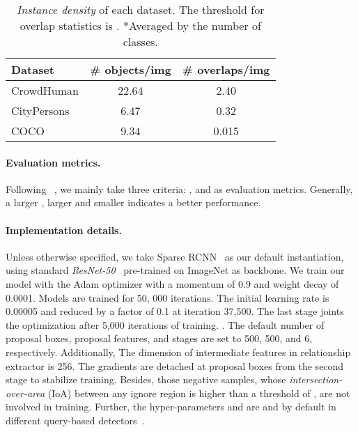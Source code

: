 \documentclass[final]{cvpr}
\begin{document}
\begin{table}[t]
  \centering
  \begin{tabular}{l|c|c}
      \toprule
      Dataset & \# objects/img & \# overlaps/img  \\
      \hline
      CrowdHuman \cite{shao2018crowdhuman} & 22.64  & 2.40 \\
      CityPersons \cite{zhang2017citypersons} & 6.47  & 0.32 \\
      COCO \cite{lin2014microsoft} & 9.34  & 0.015 \\
      \bottomrule
  \end{tabular}
  \vspace{-2pt}
  \caption{\emph{Instance density} of each dataset.  The threshold for overlap statistics is .  *Averaged by the number of classes.}
  \label{tbl:datasets}
\vspace{-1.pc}
\end{table} 

\vspace{-1pc} 
\paragraph{Evaluation metrics.}

Following ~\cite{chu2020detection}, we mainly take three criteria: ,  and  as evaluation metrics. Generally, a larger , larger  and smaller  indicates a better performance.

\vspace{-1pc} 
\paragraph{Implementation details.} 
Unless otherwise specified, we take Sparse RCNN~\cite{sun2020sparse} as our default instantiation, using standard \textit{ResNet-50}~\cite{he2016deep} pre-trained on ImageNet as backbone. We train our model with the Adam optimizer with a momentum of 0.9 and weight decay of 0.0001. Models are trained for 50, 000 iterations. The initial learning rate is 0.00005 and reduced by a factor of 0.1 at iteration 37,500. The last stage joints the optimization after 5,000 iterations of training. . The default number of proposal boxes, proposal features, and stages are set to 500, 500, and 6, respectively. Additionally, The dimension of intermediate features in relationship extractor  is 256. The gradients are detached at proposal boxes from the second stage to stabilize training. Besides, those negative samples, whose \textit{intersection-over-area} (IoA) between any ignore region is higher than a threshold of ,  are not involved in training. Further, the hyper-parameters  and  are  and  by default in different query-based detectors~\cite{sun2020sparse,zhu2021deformable}. 
\end{document}
